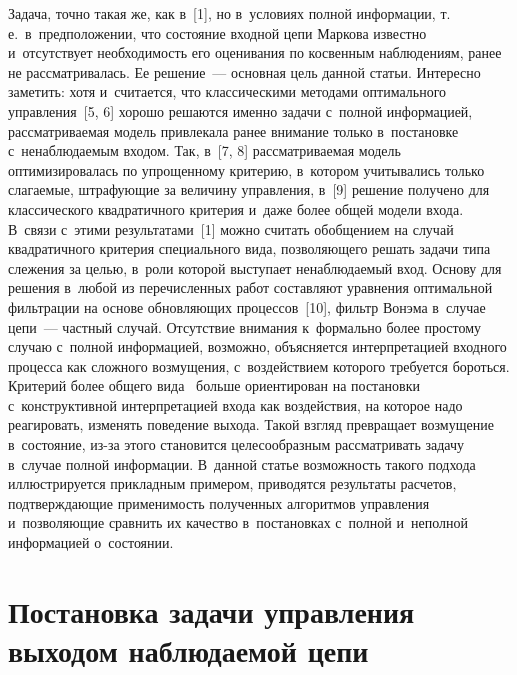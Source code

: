 \begin{multicols}{2}
     Задача, точно такая же, как в~[1], но в~условиях полной информации, 
т.\,е.\ в~предположении, что состояние входной цепи Маркова известно 
и~отсутствует необходимость его оценивания по косвенным наблюдениям, 
ранее не рассматривалась. Ее решение~--- основная цель данной статьи. 
Интересно заметить: хотя и~считается, что классическими методами 
оптимального управления~[5, 6] хорошо решаются именно задачи с~полной 
информацией, рассматриваемая модель привлекала ранее внимание только 
в~постановке с~ненаблюдаемым входом. Так, в~[7, 8] рассматриваемая 
модель оптимизировалась по упрощенному критерию, в~котором 
учитывались только слагаемые, штра\-фу\-ющие за величину управ\-ле\-ния, в~[9] 
решение получено для классического квад\-ра\-тич\-но\-го критерия и~даже более 
общей модели входа. В~связи с~этими результатами~[1] можно считать 
обобщением на случай квадратичного критерия специального вида, 
позволяющего решать задачи типа слежения за целью, в~роли которой 
выступает ненаблюдаемый вход. Основу для решения в~любой из 
перечисленных работ со\-став\-ля\-ют уравнения оптимальной фильт\-ра\-ции на 
основе обновляющих процессов~[10], фильтр Вонэма в~случае цепи~--- 
частный случай. Отсутствие внимания к~формально более прос\-то\-му случаю 
с~полной информацией, воз\-мо\-жно, объясняется интерпретацией входного 
процесса как сложного возмущения, с~воздействием которого требуется 
бороться. Критерий более общего вида~\cite{1-bos, 4-bos} больше 
ориентирован на постановки с~конструктивной интерпретацией входа как 
воздействия, на которое надо реагировать, изменять поведение выхода. 
Такой взгляд превращает возмущение в~со\-сто\-яние, из-за этого становится 
целесообразным рассматривать задачу в~случае полной информации. 
В~данной статье возможность такого подхода иллюстрируется при\-клад\-ным 
примером, приводятся результаты расчетов, подтверждающие при\-ме\-ни\-мость 
полученных алгоритмов управления и~позволяющие сравнить их качество 
в~постановках с~полной и~неполной информацией о~со\-сто\-янии.
{

}
     
\section{Постановка задачи управления выходом наблюдаемой 
цепи}


\end{multicols}

